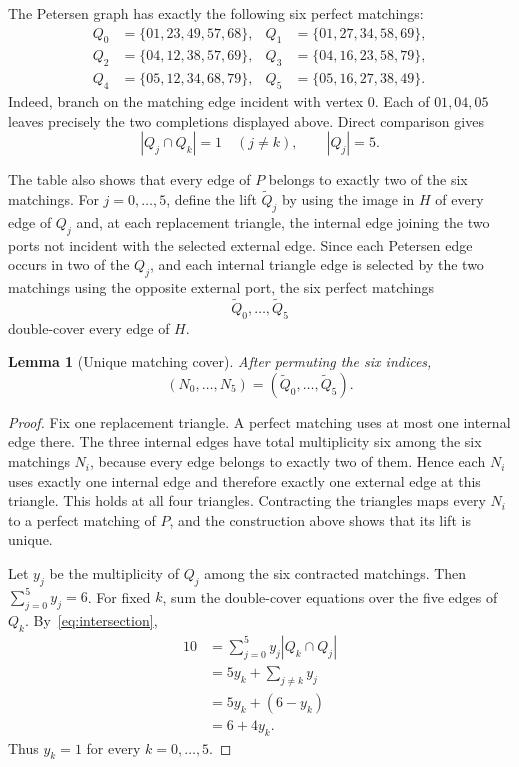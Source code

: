 \documentclass[11pt]{article}
\newtheorem{lemma}[theorem]{Lemma}
\theoremstyle{definition}
\begin{document}
The Petersen graph has exactly the following six perfect matchings:
\begin{align}
Q_0&=\{01,23,49,57,68\},&
Q_1&=\{01,27,34,58,69\},\nonumber\\
Q_2&=\{04,12,38,57,69\},&
Q_3&=\{04,16,23,58,79\},\label{eq:p-matchings}\\
Q_4&=\{05,12,34,68,79\},&
Q_5&=\{05,16,27,38,49\}.\nonumber
\end{align}
Indeed, branch on the matching edge incident with vertex $0$.  Each of
$01,04,05$ leaves precisely the two completions displayed above.  Direct
comparison gives
\begin{equation}\label{eq:intersection}
|Q_j\cap Q_k|=1\quad(j\neq k),
\qquad |Q_j|=5.
\end{equation}

The table also shows that every edge of $P$ belongs to exactly two of the six
matchings.  For $j=0,\ldots,5$, define the lift $\widetilde Q_j$ by using the
image in $H$ of every edge of $Q_j$ and, at each replacement triangle, the
internal edge joining the two ports not incident with the selected external
edge.  Since each Petersen edge occurs in two of the $Q_j$, and each internal
triangle edge is selected by the two matchings using the opposite external
port, the six perfect matchings
\[
\widetilde Q_0,\ldots,\widetilde Q_5
\]
double-cover every edge of $H$.

\begin{lemma}[Unique matching cover]\label{lem:unique-cover}
After permuting the six indices,
\[
(N_0,\ldots,N_5)
=
(\widetilde Q_0,\ldots,\widetilde Q_5).
\]
\end{lemma}

\begin{proof}
Fix one replacement triangle.  A perfect matching uses at most one internal
edge there.  The three internal edges have total multiplicity six among the
six matchings $N_i$, because every edge belongs to exactly two of them.  Hence
each $N_i$ uses exactly one internal edge and therefore exactly one external
edge at this triangle.  This holds at all four triangles.  Contracting the
triangles maps every $N_i$ to a perfect matching of $P$, and the construction
above shows that its lift is unique.

Let $y_j$ be the multiplicity of $Q_j$ among the six contracted matchings.
Then $\sum_{j=0}^{5}y_j=6$.  For fixed $k$, sum the double-cover equations
over the five edges of $Q_k$.  By~\eqref{eq:intersection},
\begin{align*}
10
  &=\sum_{j=0}^{5}y_j|Q_k\cap Q_j|\\
  &=5y_k+\sum_{j\neq k}y_j\\
  &=5y_k+(6-y_k)\\
  &=6+4y_k.
\end{align*}
Thus $y_k=1$ for every $k=0,\ldots,5$.
\end{proof}
\end{document}
